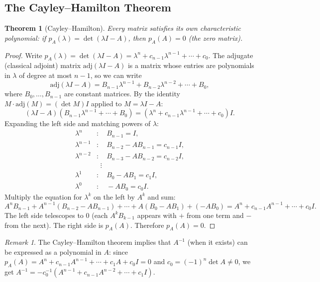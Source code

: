 \documentclass[11pt,a4paper]{article}
\theoremstyle{definition}
\theoremstyle{plain}
\newtheorem{theorem}{Theorem}[section]
\theoremstyle{remark}
\newtheorem{remark}{Remark}[section]
\begin{document}
\subsection{The Cayley--Hamilton Theorem}
\label{subsec:cayley_hamilton}

\begin{theorem}[Cayley--Hamilton]
\label{thm:cayley_hamilton}
Every matrix satisfies its own characteristic polynomial: if $p_A(\lambda) = \det(\lambda I - A)$,
then $p_A(A) = 0$ (the zero matrix).
\end{theorem}

\begin{proof}
Write $p_A(\lambda) = \det(\lambda I - A) = \lambda^n + c_{n-1}\lambda^{n-1} + \cdots + c_0$.
The adjugate (classical adjoint) matrix $\mathrm{adj}(\lambda I - A)$ is a matrix whose entries
are polynomials in $\lambda$ of degree at most $n-1$, so we can write
\[
    \mathrm{adj}(\lambda I - A) = B_{n-1}\lambda^{n-1} + B_{n-2}\lambda^{n-2} + \cdots + B_0,
\]
where $B_0, \ldots, B_{n-1}$ are constant matrices. By the identity
$M \cdot \mathrm{adj}(M) = (\det M) I$ applied to $M = \lambda I - A$:
\[
    (\lambda I - A)(B_{n-1}\lambda^{n-1} + \cdots + B_0)
    = (\lambda^n + c_{n-1}\lambda^{n-1} + \cdots + c_0) I.
\]
Expanding the left side and matching powers of $\lambda$:
\begin{align*}
    \lambda^n &: \quad B_{n-1} = I, \\
    \lambda^{n-1} &: \quad B_{n-2} - AB_{n-1} = c_{n-1}I, \\
    \lambda^{n-2} &: \quad B_{n-3} - AB_{n-2} = c_{n-2}I, \\
    &\;\;\vdots \\
    \lambda^1 &: \quad B_0 - AB_1 = c_1 I, \\
    \lambda^0 &: \quad -AB_0 = c_0 I.
\end{align*}
Multiply the equation for $\lambda^k$ on the left by $A^k$ and sum:
\[
    A^n B_{n-1} + A^{n-1}(B_{n-2} - AB_{n-1}) + \cdots + A(B_0 - AB_1) + (-AB_0)
    = A^n + c_{n-1}A^{n-1} + \cdots + c_0 I.
\]
The left side telescopes to $0$ (each $A^k B_{k-1}$ appears with $+$ from one term and $-$
from the next). The right side is $p_A(A)$. Therefore $p_A(A) = 0$.
\end{proof}

\begin{remark}
The Cayley--Hamilton theorem implies that $A^{-1}$ (when it exists) can be expressed as a
polynomial in $A$: since $p_A(A) = A^n + c_{n-1}A^{n-1} + \cdots + c_1 A + c_0 I = 0$
and $c_0 = (-1)^n \det A \neq 0$, we get
$A^{-1} = -c_0^{-1}(A^{n-1} + c_{n-1}A^{n-2} + \cdots + c_1 I)$.
\end{remark}
\end{document}
